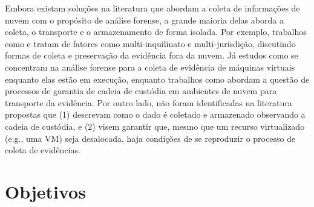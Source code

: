 %
Embora existam soluções na literatura que abordam a coleta de informações de nuvem com o propósito de análise forense, a grande maioria delas aborda a coleta, o transporte e o armazenamento de forma isolada.
%
Por exemplo, trabalhos como \cite{DykstraFROST:2013} e \cite{ReichertAutoAcquisition:2015} tratam de fatores como multi-inquilinato e multi-jurisdição, discutindo formas de coleta e preservação da evidência fora da nuvem.
%
Já estudos como \cite{GeorgeDF2CE:2012} se concentram na análise forense para a coleta de evidência de máquinas virtuais enquanto elas estão em execução, enquanto trabalhos como \cite{SangLogApproach:2013} abordam a questão de processos de garantia de cadeia de custódia em ambientes de nuvem para transporte da evidência.
%
%
%
Por outro lado, não foram identificadas na literatura propostas que (1) descrevam como o dado é coletado e armazenado observando a cadeia de custódia, e (2) visem garantir que, mesmo que um recurso virtualizado (e.g., uma VM) seja desalocada, haja condições de se reproduzir o processo de coleta de evidências.

\section{Objetivos}

